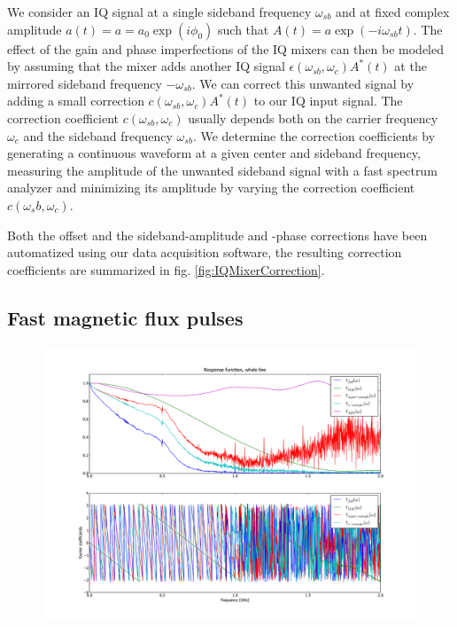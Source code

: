 We consider an IQ signal at a single sideband frequency $\omega_{sb}$ and at fixed complex amplitude $a(t) = a = a_0\exp{(i\phi_0)}$ such that $A(t) = a\exp{(-i \omega_{sb} t)}$. The effect of the gain and phase imperfections of the IQ mixers can then be modeled by assuming that the mixer adds another IQ signal $\epsilon(\omega_{sb},\omega_c)A^*(t)$ at the mirrored sideband frequency $-\omega_{sb}$. We can correct this unwanted signal by adding a small correction $c(\omega_{sb},\omega_c)A^*(t)$ to our IQ input signal. The correction coefficient $c(\omega_{sb},\omega_c)$ usually depends both on the carrier frequency $\omega_c$ and the sideband frequency $\omega_{sb}$. We determine the correction coefficients by generating a continuous waveform at a given center and sideband frequency, measuring the amplitude of the unwanted sideband signal with a fast spectrum analyzer and minimizing its amplitude by varying the correction coefficient $c(\omega_sb,\omega_c)$.

Both the offset and the sideband-amplitude and -phase corrections have been automatized using our data acquisition software, the resulting correction coefficients are summarized in fig. \ref{fig:IQMixerCorrection}.	

\subsection{Fast magnetic flux pulses}

\begin{figure}[ht!]
   \centering
	 \includegraphics[width=1\textwidth]{"data/ct5/2010_06_15 - fluxline response/response_function_full"}
	 \caption[]{}
	 \label{fig:FluxLineResponseFunction}
\end{figure}

